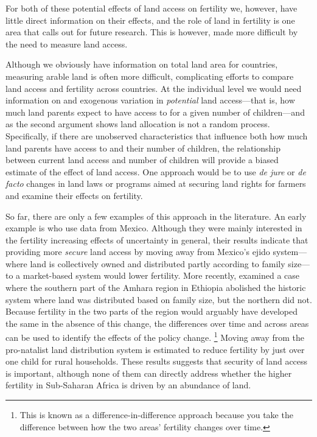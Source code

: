 \documentclass[letterpaper,12pt]{article}
\begin{document}
For both of these potential effects of land access on fertility we,
however, have little direct information on their effects, and the role
of land in fertility is one area that calls out for future research. 
This is however, made more difficult by the need to measure land access.

Although we obviously have information on total land area for countries,
measuring arable land is often more difficult, complicating efforts to
compare land access and fertility across countries. 
At the individual level we would need information on and exogenous
variation in \emph{potential} land access---that is, how much land
parents expect to have access to for a given number of children---and as
the second argument shows land allocation is not a random process. 
Specifically, if there are unobserved characteristics that influence
both how much land parents have access to and their number of children,
the relationship between current land access and number of children will
provide a biased estimate of the effect of land access. 
One approach would be to use \emph{de jure} or \emph{de facto} changes
in land laws or programs aimed at securing land rights for farmers and
examine their effects on fertility.

So far, there are only a few examples of this approach in the
literature. 
An early example is \citet{de_vany77} who use data from Mexico. 
Although they were mainly interested in the fertility increasing effects
of uncertainty in general, their results indicate that providing more
\emph{secure} land access by moving away from Mexico's ejido
system---where land is collectively owned and distributed partly
according to family size---to a market-based system would lower
fertility. 
More recently, \citet{Ali2015} examined a case where the southern part
of the Amhara region in Ethiopia abolished the historic system where
land was distributed based on family size, but the northern did not. 
Because fertility in the two parts of the region would arguably have
developed the same in the absence of this change, the differences over
time and across areas can be used to identify the effects of the policy
change.%
\footnote{
This is known as a difference-in-difference approach because you take
the difference between how the two areas' fertility changes over time.} 
Moving away from the pro-natalist land distribution system is estimated
to reduce fertility by just over one child for rural households. 
These results suggests that security of land access is important,
although none of them can directly address whether the higher fertility
in Sub-Saharan Africa is driven by an abundance of land.
\end{document}
